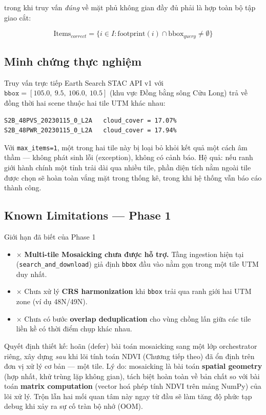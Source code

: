 \documentclass[12pt,a4paper]{report}
\begin{document}
trong khi truy vấn \textit{đúng} về mặt phủ không gian đầy đủ phải là hợp toàn bộ tập giao cắt:

\begin{equation}
    \text{Items}_{correct} = \big\{i \in I : \text{footprint}(i) \cap \text{bbox}_{query} \neq \emptyset\big\}
\end{equation}

\subsection{Minh chứng thực nghiệm}

Truy vấn trực tiếp Earth Search STAC API v1 với $\texttt{bbox} = [105.0,\ 9.5,\ 106.0,\ 10.5]$ (khu vực Đồng bằng sông Cửu Long) trả về đồng thời hai scene thuộc hai tile UTM khác nhau:

\begin{lstlisting}[language=bash, numbers=none]
S2B_48PVS_20230115_0_L2A   cloud_cover = 17.07%
S2B_48PWR_20230115_0_L2A   cloud_cover = 17.94%
\end{lstlisting}

Với \texttt{max\_items=1}, một trong hai tile này bị loại bỏ khỏi kết quả một cách âm thầm — không phát sinh lỗi (exception), không có cảnh báo. Hệ quả: nếu ranh giới hành chính một tỉnh trải dài qua nhiều tile, phần diện tích nằm ngoài tile được chọn sẽ hoàn toàn vắng mặt trong thống kê, trong khi hệ thống vẫn báo cáo thành công.

\subsection{Known Limitations — Phase 1}

\begin{warningbox}{Giới hạn đã biết của Phase 1}
\begin{itemize}
    \item \textcolor{red!60!black}{$\times$} \textbf{Multi-tile Mosaicking chưa được hỗ trợ.} Tầng ingestion hiện tại (\texttt{search\_and\_download}) giả định \texttt{bbox} đầu vào nằm gọn trong một tile UTM duy nhất.
    \item \textcolor{red!60!black}{$\times$} Chưa xử lý \textbf{CRS harmonization} khi \texttt{bbox} trải qua ranh giới hai UTM zone (ví dụ 48N/49N).
    \item \textcolor{red!60!black}{$\times$} Chưa có bước \textbf{overlap deduplication} cho vùng chồng lấn giữa các tile liền kề có thời điểm chụp khác nhau.
\end{itemize}
\end{warningbox}

Quyết định thiết kế: hoãn (defer) bài toán mosaicking sang một lớp orchestrator riêng, xây dựng \textit{sau} khi lõi tính toán NDVI (Chương tiếp theo) đã ổn định trên đơn vị xử lý cơ bản — một tile. Lý do: mosaicking là bài toán \textbf{spatial geometry} (hợp nhất, khử trùng lặp không gian), tách biệt hoàn toàn về bản chất so với bài toán \textbf{matrix computation} (vector hoá phép tính NDVI trên mảng NumPy) của lõi xử lý. Trộn lẫn hai mối quan tâm này ngay từ đầu sẽ làm tăng độ phức tạp debug khi xảy ra sự cố tràn bộ nhớ (OOM).
\end{document}
